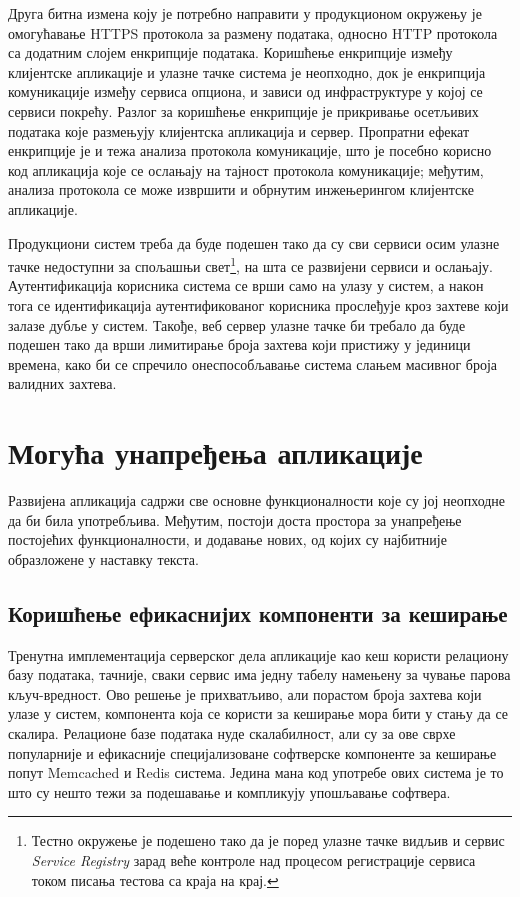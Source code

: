 \documentclass[12pt,oneside]{memoir}
\begin{document}
Друга битна измена коју је потребно направити у продукционом окружењу је омогућавање HTTPS протокола за размену података, односно HTTP протокола са додатним слојем енкрипције података. Коришћење енкрипције између клијентске апликације и улазне тачке система је неопходно, док је енкрипција комуникације између сервиса опциона, и зависи од инфраструктуре у којој се сервиси покрећу. Разлог за коришћење енкрипције је прикривање осетљивих података које размењују клијентска апликација и сервер. Пропратни ефекат енкрипције је и тежа анализа протокола комуникације, што је посебно корисно код апликација које се ослањају на тајност протокола комуникације; међутим, анализа протокола се може извршити и обрнутим инжењерингом клијентске апликације.

Продукциони систем треба да буде подешен тако да су сви сервиси осим улазне тачке недоступни за спољашњи свет\footnote{Тестно окружење је подешено тако да је поред улазне тачке видљив и сервис \textit{Service Registry} зарад веће контроле над процесом регистрације сервиса током писања тестова са краја на крај.}, на шта се развијени сервиси и ослањају. Аутентификација корисника система се врши само на улазу у систем, а након тога се идентификација аутентификованог корисника прослеђује кроз захтеве који залазе дубље у систем. Такође, веб сервер улазне тачке би требало да буде подешен тако да врши лимитирање броја захтева који пристижу у јединици времена, како би се спречило онеспособљавање система слањем масивног броја валидних захтева.

\section{Могућа унапређења апликације}
Развијена апликација садржи све основне функционалности које су јој неопходне да би била употребљива. Међутим, постоји доста простора за унапређење постојећих функционалности, и додавање нових, од којих су најбитније образложене у наставку текста.

\subsection{Коришћење ефикаснијих компоненти за кеширање}
Тренутна имплементација серверског дела апликације као кеш користи релациону базу података, тачније, сваки сервис има једну табелу намењену за чување парова кључ-вредност. Ово решење је прихватљиво, али порастом броја захтева који улазе у систем, компонента која се користи за кеширање мора бити у стању да се скалира. Релационе базе података нуде скалабилност, али су за ове сврхе популарније и ефикасније специјализоване софтверске компоненте за кеширање попут Memcached \cite{memcached} и Redis \cite{redis} система. Једина мана код употребе ових система је то што су нешто тежи за подешавање и компликују упошљавање софтвера.
\end{document}
